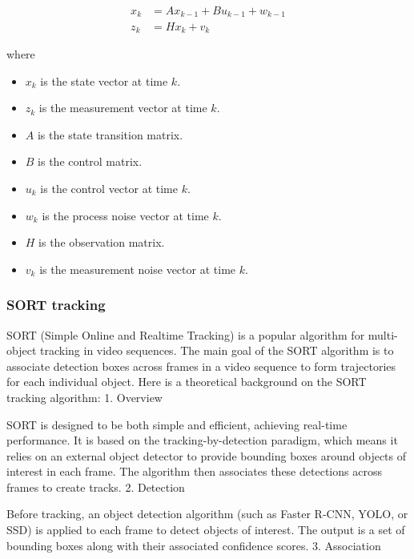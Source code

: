 \begin{equation}
    \begin{aligned}
        x_k & = Ax_{k - 1} + Bu_{k - 1} + w_{k - 1} \\
        z_k & = Hx_k + v_k
    \end{aligned}
    \label{eq:kalman_filter}
\end{equation}

where

\begin{itemize}
    \item $x_k$ is the state vector at time $k$.
    \item $z_k$ is the measurement vector at time $k$.
    \item $A$ is the state transition matrix.
    \item $B$ is the control matrix.
    \item $u_k$ is the control vector at time $k$.
    \item $w_k$ is the process noise vector at time $k$.
    \item $H$ is the observation matrix.
    \item $v_k$ is the measurement noise vector at time $k$.
\end{itemize}


\subsubsection{SORT tracking} \label{subsubsec:sort_tracking}
SORT (Simple Online and Realtime Tracking) is a popular algorithm for multi-object tracking in video sequences. The main goal of the SORT algorithm is to associate detection boxes across frames in a video sequence to form trajectories for each individual object. Here is a theoretical background on the SORT tracking algorithm:
1. Overview

SORT is designed to be both simple and efficient, achieving real-time performance. It is based on the tracking-by-detection paradigm, which means it relies on an external object detector to provide bounding boxes around objects of interest in each frame. The algorithm then associates these detections across frames to create tracks.
2. Detection

Before tracking, an object detection algorithm (such as Faster R-CNN, YOLO, or SSD) is applied to each frame to detect objects of interest. The output is a set of bounding boxes along with their associated confidence scores.
3. Association

